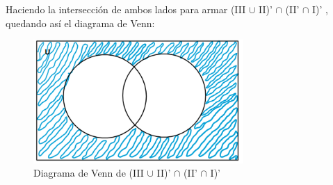 \newpage

Haciendo la intersección de ambos lados para armar (III $\cup$ II)' $\cap$ (II' $\cap$ I)' , quedando así el diagrama de Venn:

\begin{figure}[htbp]
\centering
\includegraphics[width=8cm]{e/aabb.png}
\caption[]{Diagrama de Venn de (III $\cup$ II)' $\cap$ (II' $\cap$ I)' }
\end{figure} 
